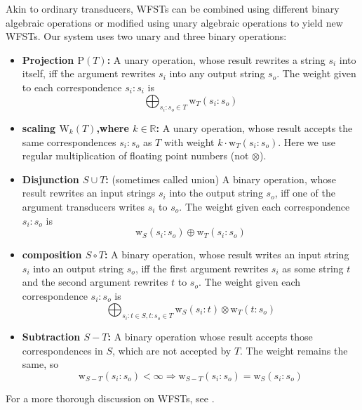\documentclass[a4paper,conference]{IEEEtran}
\begin{document}
Akin to ordinary transducers, WFSTs can be combined using
different binary algebraic operations or modified using unary
algebraic operations to yield new WFSTs. Our system uses two unary and three binary operations:
\begin{itemize}
\item {\bf Projection $\mathrm{P}(T)$:} A unary operation, whose result
  rewrites a string $s_i$ into itself, iff the argument rewrites $s_i$
  into any output string $s_o$. The weight given to each correspondence
  $s_i:s_i$ is
  \begin{equation}
    \bigoplus_{s_i\mathrm{:}s_o \in T} \mathrm{w}_T(s_i\mathrm{:}s_o)
  \end{equation}
\item {\bf scaling $\mathrm{W}_k(T)$,where $k \in \mathbb{R}$:} A unary operation, whose result accepts the same correspondences $s_i\mathrm{:}s_o$ as $T$ with weight $k\cdot \mathrm{w}_T(s_i\mathrm{:}s_o)$. Here we use regular multiplication of floating point numbers (not $\otimes$).
\item {\bf Disjunction $S \cup T$:} (sometimes called union) A binary
  operation, whose result rewrites an input strings $s_i$ into the
  output string $s_o$, iff one of the argument transducers writes
  $s_i$ to $s_o$. The weight given each correspondence
  $s_i\mathrm{:}s_o$ is
  \begin{equation}
    \mathrm{w}_S(s_i\mathrm{:}s_o) \oplus \mathrm{w}_T(s_i\mathrm{:}s_o)
  \end{equation}
\item {\bf composition $S \circ T$:} A binary operation, whose result
  writes an input string $s_i$ into an output string $s_o$, iff the
  first argument rewrites $s_i$ as some string $t$ and the second
  argument rewrites $t$ to $s_o$. The weight given each correspondence
  $s_i\mathrm{:}s_o$ is
  \begin{equation}
    \bigoplus_{s_i\mathrm{:}t \in S, t\mathrm{:}s_o \in T} \mathrm{w}_S(s_i\mathrm{:}t) \otimes \mathrm{w}_T(t\mathrm{:}s_o)
    \end{equation}
\item {\bf Subtraction $S - T$:} A binary operation whose result accepts those correspondences in $S$, which are not accepted by $T$. The weight remains the same, so
  \begin{equation}
    \mathrm{w}_{S-T}(s_i\mathrm{:}s_o) < \infty \Rightarrow \mathrm{w}_{S-T}(s_i\mathrm{:}s_o) = \mathrm{w}_{S}(s_i\mathrm{:}s_o)
  \end{equation}
\end{itemize}
For a more thorough discussion on WFSTs, see \cite{openfst/2007}.
\end{document}
